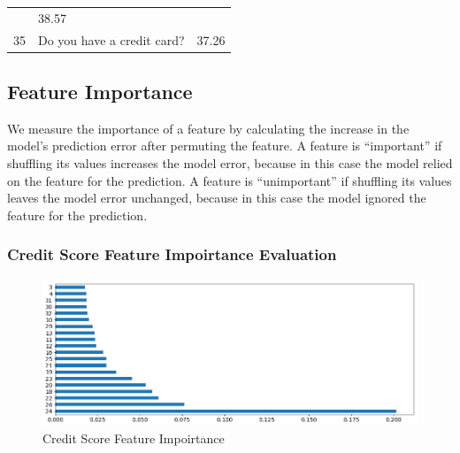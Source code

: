 \begin{longtable}[]{@{}lll@{}}
\begin{minipage}[t]{0.77\columnwidth}
\end{minipage} & \begin{minipage}[t]{0.09\columnwidth}\raggedright
38.57\strut
\end{minipage}\tabularnewline
\begin{minipage}[t]{0.05\columnwidth}\raggedright
35\strut
\end{minipage} & \begin{minipage}[t]{0.77\columnwidth}\raggedright
Do you have a credit card?\strut
\end{minipage} & \begin{minipage}[t]{0.09\columnwidth}\raggedright
37.26\strut
\end{minipage}\tabularnewline
\bottomrule
\end{longtable}

\hypertarget{feature-importance}{%
\subsection{Feature Importance}\label{feature-importance}}

We measure the importance of a feature by calculating the increase in
the model's prediction error after permuting the feature. A feature is
``important'' if shuffling its values increases the model error, because
in this case the model relied on the feature for the prediction. A
feature is ``unimportant'' if shuffling its values leaves the model
error unchanged, because in this case the model ignored the feature for
the prediction.

\hypertarget{credit-score-feature-impoirtance-evaluation}{%
\subsubsection{Credit Score Feature Impoirtance
Evaluation}\label{credit-score-feature-impoirtance-evaluation}}

\begin{Schunk}
\begin{figure}[H]

{\centering \includegraphics[width=1\linewidth]{../../artifacts/cfimportance} 

}

\caption[Credit Score Feature Impoirtance]{Credit Score Feature Impoirtance}\label{fig:cfi}
\end{figure}
\end{Schunk}

